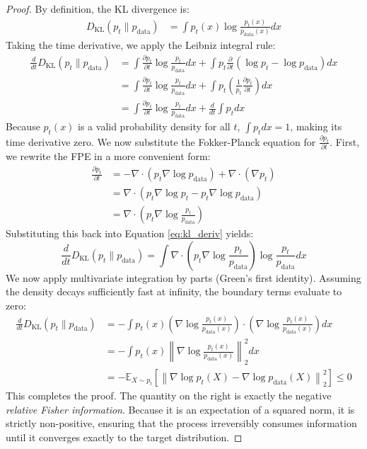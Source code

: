 \begin{proof}
By definition, the KL divergence is:
\begin{align*}
    D_{\text{KL}}(p_t \parallel p_{\text{data}}) &= \int p_t(x) \log \frac{p_t(x)}{p_{\text{data}}(x)} dx
\end{align*}
Taking the time derivative, we apply the Leibniz integral rule:
\begin{align}
    \frac{d}{dt} D_{\text{KL}}(p_t \parallel p_{\text{data}}) &= \int \frac{\partial p_t}{\partial t} \log \frac{p_t}{p_{\text{data}}} dx + \int p_t \frac{\partial}{\partial t} \left( \log p_t - \log p_{\text{data}} \right) dx \nonumber \\
    &= \int \frac{\partial p_t}{\partial t} \log \frac{p_t}{p_{\text{data}}} dx + \int p_t \left( \frac{1}{p_t} \frac{\partial p_t}{\partial t} \right) dx \nonumber \\
    &= \int \frac{\partial p_t}{\partial t} \log \frac{p_t}{p_{\text{data}}} dx + \frac{d}{dt} \int p_t dx \label{eq:kl_deriv}
\end{align}
Because $p_t(x)$ is a valid probability density for all $t$, $\int p_t dx = 1$, making its time derivative zero. We now substitute the Fokker-Planck equation for $\frac{\partial p_t}{\partial t}$. First, we rewrite the FPE in a more convenient form:
\begin{align*}
    \frac{\partial p_t}{\partial t} &= -\nabla \cdot \left( p_t \nabla \log p_{\text{data}} \right) + \nabla \cdot \left( \nabla p_t \right) \\
    &= \nabla \cdot \left( p_t \nabla \log p_t - p_t \nabla \log p_{\text{data}} \right) \\
    &= \nabla \cdot \left( p_t \nabla \log \frac{p_t}{p_{\text{data}}} \right)
\end{align*}
Substituting this back into Equation \eqref{eq:kl_deriv} yields:
\begin{equation*}
    \frac{d}{dt} D_{\text{KL}}(p_t \parallel p_{\text{data}}) = \int \nabla \cdot \left( p_t \nabla \log \frac{p_t}{p_{\text{data}}} \right) \log \frac{p_t}{p_{\text{data}}} dx
\end{equation*}
We now apply multivariate integration by parts (Green's first identity). Assuming the density decays sufficiently fast at infinity, the boundary terms evaluate to zero:
\begin{align*}
    \frac{d}{dt} D_{\text{KL}}(p_t \parallel p_{\text{data}}) &= -\int p_t(x) \left( \nabla \log \frac{p_t(x)}{p_{\text{data}}(x)} \right) \cdot \left( \nabla \log \frac{p_t(x)}{p_{\text{data}}(x)} \right) dx \\
    &= -\int p_t(x) \left\| \nabla \log \frac{p_t(x)}{p_{\text{data}}(x)} \right\|_2^2 dx \\
    &= -\mathbb{E}_{X \sim p_t} \left[ \left\| \nabla \log p_t(X) - \nabla \log p_{\text{data}}(X) \right\|_2^2 \right] \le 0
\end{align*}
This completes the proof. The quantity on the right is exactly the negative \emph{relative Fisher information}. Because it is an expectation of a squared norm, it is strictly non-positive, ensuring that the process irreversibly consumes information until it converges exactly to the target distribution.
\end{proof}


